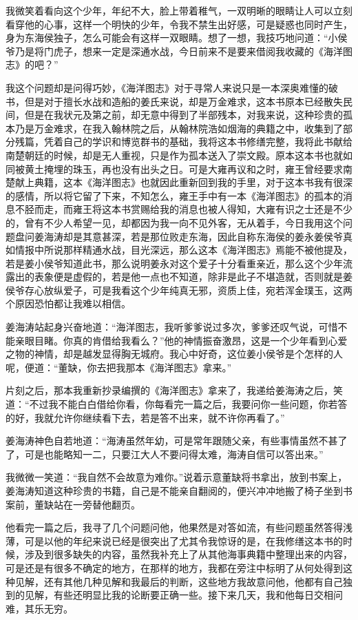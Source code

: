 我微笑着看向这个少年，年纪不大，脸上带着稚气，一双明晰的眼睛让人可以立刻看穿他的心事，这样一个明快的少年，令我不禁生出好感，可是疑惑也同时产生，身为东海侯独子，怎么可能会有这样一双眼睛。想了一想，我技巧地问道：“小侯爷乃是将门虎子，想来一定是深通水战，今日前来不是要来借阅我收藏的《海洋图志》的吧？”

我这个问题却是问得巧妙，《海洋图志》对于寻常人来说只是一本深奥难懂的破书，但是对于擅长水战和造船的姜氏来说，却是万金难求，这本书原本已经散失民间，但是在我状元及第之前，却无意中得到了半部残本，对我来说，这种珍贵的孤本乃是万金难求，在我入翰林院之后，从翰林院浩如烟海的典籍之中，收集到了部分残篇，凭着自己的学识和博览群书的基础，我将这本书修缮完整，我将此书献给南楚朝廷的时候，却是无人重视，只是作为孤本送入了崇文殿。原本这本书也就如同被黄土掩埋的珠玉，再也没有出头之日。可是大雍再议和之时，雍王曾经要求南楚献上典籍，这本《海洋图志》也就因此重新回到我的手里，对于这本书我有很深的感情，所以将它留了下来，不知怎么，雍王手中有一本《海洋图志》的孤本的消息不胫而走，而雍王将这本书赏赐给我的消息也被人得知，大雍有识之士还是不少的，曾有不少人希望一见，却都因为我一向不见外客，无从着手，今日我用这个问题盘问姜海涛却是其意甚深，若是那位败走东海，因此自称东海侯的姜永姜侯爷真如情报中所说那样精通水战，目光深远，那么这本《海洋图志》焉能不被他提及，若是姜小侯爷知道此书，那么说明姜永对这个爱子十分看重亲近，那么这个少年流露出的表象便是虚假的，若是他一点也不知道，除非是此子不堪造就，否则就是姜侯爷存心放纵爱子，可是我看这个少年纯真无邪，资质上佳，宛若浑金璞玉，这两个原因恐怕都让我难以相信。

姜海涛站起身兴奋地道：“海洋图志，我听爹爹说过多次，爹爹还叹气说，可惜不能亲眼目睹。你真的肯借给我看么？”他的神情振奋激昂，这是一个少年看到心爱之物的神情，却是越发显得胸无城府。我心中好奇，这位姜小侯爷是个怎样的人呢，便道：“董缺，你去把我那本《海洋图志》拿来。”

片刻之后，那本我重新抄录编撰的《海洋图志》拿来了，我递给姜海涛之后，笑道：“不过我不能白白借给你看，你每看完一篇之后，我要问你一些问题，你若答的好，我就允许你继续看下去，若是答不出来，就不许你再看了。”

姜海涛神色自若地道：“海涛虽然年幼，可是常年跟随父亲，有些事情虽然不甚了了，可是也能略知一二，只要江大人不要问得太难，海涛自信可以答出来。”

我微微一笑道：“我自然不会故意为难你。”说着示意董缺将书拿出，放到书案上，姜海涛知道这种珍贵的书籍，自己是不能亲自翻阅的，便兴冲冲地搬了椅子坐到书案前，董缺站在一旁替他翻页。

他看完一篇之后，我寻了几个问题问他，他果然是对答如流，有些问题虽然答得浅薄，可是以他的年纪来说已经是很突出了尤其令我惊讶的是，在我修缮这本书的时候，涉及到很多缺失的内容，虽然我补充上了从其他海事典籍中整理出来的内容，可是还是有很多不确定的地方，在那样的地方，我都在旁注中标明了从何处得到这种见解，还有其他几种见解和我最后的判断，这些地方我故意问他，他都有自己独到的见解，有些还明显比我的论断要正确一些。接下来几天，我和他每日交相问难，其乐无穷。


